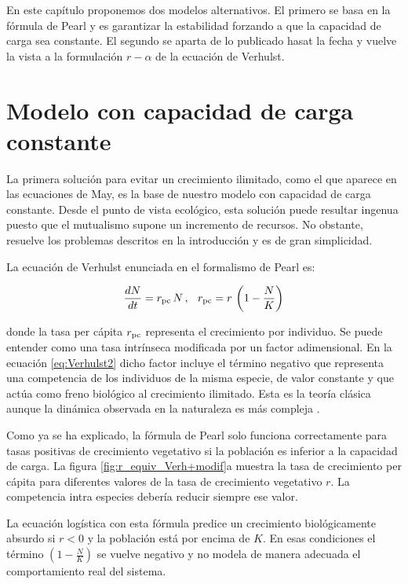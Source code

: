 En este capítulo proponemos dos modelos alternativos. El primero se basa en la fórmula de Pearl y es garantizar la estabilidad forzando a que la capacidad de carga sea constante. El segundo se aparta de lo publicado hasat la fecha y vuelve la vista a la formulación $r-\alpha$ de la ecuación de Verhulst.

\clearpage
\section{Modelo con capacidad de carga constante}

La primera solución para evitar un crecimiento ilimitado, como el que aparece en las ecuaciones de May, es la base de nuestro modelo con capacidad de carga constante. Desde el punto de vista ecológico, esta solución puede resultar ingenua puesto que el mutualismo supone un incremento de recursos. No obstante, resuelve los problemas descritos en la introducción y es de gran simplicidad.

La ecuación de Verhulst enunciada en el formalismo de Pearl es:

\begin{equation}
\frac{dN}{dt}=r_{\rm{pc}} \, N \, , \; \;\, r_{\rm{pc}}=r\, \left(1-\frac{N}{K}\right)
\label{eq:Verhulst2}
\end{equation}

\noindent  donde la tasa per cápita $r_{\rm{pc}}$ representa el crecimiento por individuo. Se puede entender como una tasa intrínseca 
modificada por un factor adimensional. En la ecuación \ref{eq:Verhulst2} dicho factor incluye el término negativo que representa una
competencia de los individuos de la misma especie, de valor constante y que actúa como freno biológico al crecimiento ilimitado. Esta
es la teoría clásica aunque la dinámica observada en la naturaleza es más compleja \cite{johnson2013}.

Como ya se ha explicado, la fórmula de Pearl solo funciona correctamente para tasas positivas de crecimiento vegetativo si la población
es inferior a la capacidad de carga. La figura \ref{fig:r_equiv_Verh+modif}a muestra la tasa de crecimiento per cápita para diferentes valores de la tasa de
crecimiento vegetativo $r$. La competencia intra especies debería reducir siempre ese valor.

La ecuación logística con esta fórmula predice un crecimiento biológicamente absurdo si $r<0$ y la población está por encima de $K$. En esas condiciones el término $\left(1-\frac{N}{K}\right)$ se vuelve negativo y no modela de manera adecuada el comportamiento real del sistema. 

